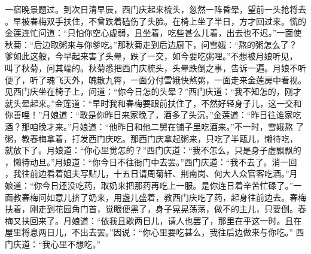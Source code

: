 一宿晚景题过。到次日清早辰，西门庆起来梳头，忽然一阵昏晕，望前一头抢将去
。早被春梅双手扶住，不曾跌着磕伤了头脸。在椅上坐了半日，方才回过来。慌的
金莲连忙问道：“只怕你空心虚弱，且坐着，吃些甚么儿着，出去也不迟。”一面使
秋菊：“后边取粥来与你爹吃。”那秋菊走到后边厨下，问雪娥：“熬的粥怎么了？
爹如此这般，今早起来害了头晕，跌了一交，如今要吃粥哩。”不想被月娘听见，
叫了秋菊，问其端的。秋菊悉把西门庆梳头，头晕跌倒之事，告诉一遍。月娘不听
便了，听了魂飞天外，魄散九霄，一面分付雪娥快熬粥，一面走来金莲房中看视。
见西门庆坐在椅子上，问道：“你今日怎的头晕？”西门庆道：“我不知怎的，刚才
就头晕起来。”金莲道：“早时我和春梅要跟前扶住了，不然好轻身子儿，这一交和
你善哩！”月娘道：“敢是你昨日来家晚了，酒多了头沉。”金莲道：“昨日往谁家吃
酒？那咱晚才来。”月娘道：“他昨日和他二舅在铺子里吃酒来。”不一时，雪娥熬
了粥，教春梅拿着，打发西门庆吃。那西门庆拿起粥来，只吃了半瓯儿，懒待吃，
就放下了。月娘道：“你心里觉怎的？”西门庆道：“我不怎么，只是身子虚飘飘的
，懒待动旦。”月娘道：“你今日不往衙门中去罢。”西门庆道：“我不去了。消一回
，我往前边看着姐夫写贴儿，十五日请周菊轩、荆南岗、何大人众官客吃酒。”月
娘道：“你今日还没吃药，取奶来把那药再吃上一服。是你连日着辛苦忙碌了。”一
面教春梅问如意儿挤了奶来，用盏儿盛着，教西门庆吃了药，起身往前边去。春梅
扶着，刚走到花园角门首，觉眼便黑了，身子晃晃荡荡，做不的主儿，只要倒。春
梅又扶回来了。月娘道：“依我且歇两日儿，请人也罢了，那里在乎这一时。且在
屋里将息两日儿，不出去罢。”因说：“你心里要吃甚么，我往后边做来与你吃。”
西门庆道：“我心里不想吃。”

